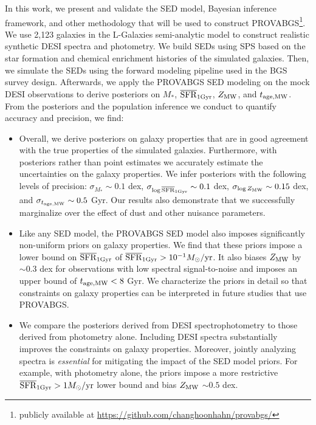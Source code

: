 In this work, we present and validate the SED model, Bayesian inference
framework, and other methodology that will be used to construct
PROVABGS\footnote{publicly available at
\href{https://github.com/changhoonhahn/provabgs/}{https://github.com/changhoonhahn/provabgs/}}.
We use 2,123 galaxies in the {\sc L-Galaxies} semi-analytic model to construct
realistic synthetic DESI spectra and photometry.  
We build SEDs using SPS based on the star formation and chemical enrichment
histories of the simulated galaxies.
Then, we simulate the SEDs using the forward modeling pipeline used in the BGS
survey design.  
Afterwards, we apply the PROVABGS SED modeling on the mock DESI observations to
derive posteriors on $M_*$, $\overline{\rm SFR}_{\rm 1Gyr}$, $Z_{\rm MW}$, and $t_{\rm age, MW}$. 
From the posteriors and the population inference we conduct to quantify
accuracy and precision, we find: 
\begin{itemize}
    \item Overall, we derive posteriors on galaxy properties that are in good
        agreement with the true properties of the simulated galaxies. 
        Furthermore, with posteriors rather than point estimates we accurately
        estimate the uncertainties on the galaxy properties. 
        We infer posteriors with the following levels of precision: 
        $\sigma_{M_*}\sim0.1$ dex, $\sigma_{\log\overline{\rm SFR}_{\rm 1Gyr}}\sim0.1$ dex, 
        $\sigma_{\log Z_{\rm MW}}\sim0.15$ dex, and $\sigma_{t_{\rm age, MW}}\sim0.5$ Gyr. 
        Our results also demonstrate that we successfully marginalize over the
        effect of dust and other nuisance parameters. 
    \item Like any SED model, the PROVABGS SED model also imposes significantly
        non-uniform priors on galaxy properties. 
        We find that these priors impose a lower bound on $\overline{\rm SFR}_{\rm 1Gyr}$ of 
        $\overline{\rm SFR}_{\rm 1Gyr} > 10^{-1}M_\odot/{\rm yr}$. 
        It also biases $Z_{\rm MW}$ by ${\sim}0.3$ dex for observations with low
        spectral signal-to-noise and imposes an upper bound of $t_{\rm age, MW} < 8$ Gyr. 
        We characterize the priors in detail so that constraints on galaxy
        properties can be interpreted in future studies that use PROVABGS.
    \item We compare the posteriors derived from DESI spectrophotometry to
        those derived from photometry alone. 
        Including DESI spectra substantially improves the constraints on galaxy
        properties. 
        Moreover, jointly analyzing spectra is {\em essential} for mitigating
        the impact of the SED model priors. 
        For example, with photometry alone, the priors impose a more
        restrictive $\overline{\rm SFR}_{\rm 1Gyr} > 1 M_\odot/{\rm yr}$ lower bound and bias $Z_{\rm MW}$
        ${\sim}0.5$ dex.
\end{itemize}

